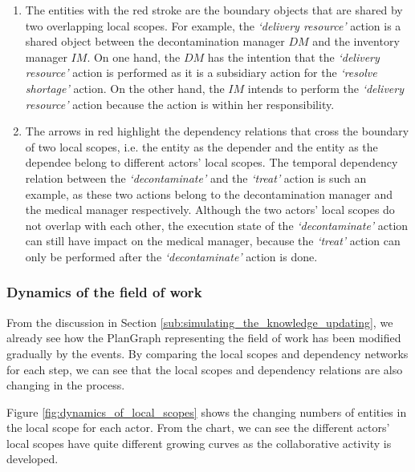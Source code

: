 \begin{enumerate}
	\item The entities with the red stroke are the boundary objects that are shared by two overlapping local scopes. For example, the \emph{`delivery resource'} action is a shared object between the decontamination manager $DM$ and the inventory manager $IM$. On one hand, the $DM$ has the intention that the \emph{`delivery resource'} action is performed as it is a subsidiary action for the \emph{`resolve shortage'} action. On the other hand, the $IM$ intends to perform the \emph{`delivery resource'} action because the action is within her responsibility. 
	\item The arrows in red highlight the dependency relations that cross the boundary of two local scopes, i.e. the entity as the depender and the entity as the dependee belong to different actors' local scopes. The temporal dependency relation between the \emph{`decontaminate'} and the \emph{`treat'} action is such an example, as these two actions belong to the decontamination manager and the medical manager respectively. Although the two actors' local scopes do not overlap with each other, the execution state of the \emph{`decontaminate'} action can still have impact on the medical manager, because the \emph{`treat'} action can only be performed after the \emph{`decontaminate'} action is done.
\end{enumerate} 

\subsubsection{Dynamics of the field of work} %
\label{ssub:dynamics_of_the_field_of_work}
From the discussion in Section \ref{sub:simulating_the_knowledge_updating}, we already see how the PlanGraph representing the field of work has been modified gradually by the events. By comparing the local scopes and dependency networks for each step, we can see that the local scopes and dependency relations are also changing in the process.

Figure \ref{fig:dynamics_of_local_scopes} shows the changing numbers of entities in the local scope for each actor. From the chart, we can see the different actors' local scopes have quite different growing curves as the collaborative activity is developed. 

